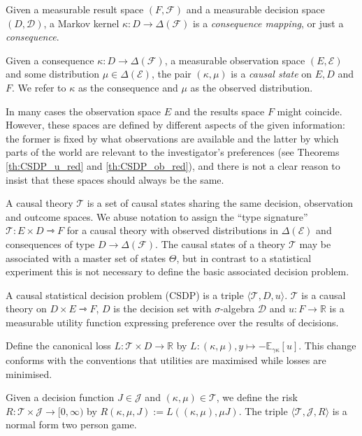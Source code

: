 \begin{definition}[Consequences]
Given a measurable result space $(F,\mathcal{F})$ and a measurable decision space $(D,\mathcal{D})$, a Markov kernel $\kappa:D \to \Delta(\mathcal{F})$ is a \emph{consequence mapping}, or just a \emph{consequence}.
\end{definition}

\begin{definition}
Given a consequence $\kappa:D\to \Delta(\mathcal{F})$, a measurable observation space $(E,\mathcal{E})$ and some distribution $\mu\in \Delta(\mathcal{E})$, the pair $(\kappa,\mu)$ is a \emph{causal state} on $E, D$ and $F$. We refer to $\kappa$ as the consequence and $\mu$ as the observed distribution.
\end{definition}

In many cases the observation space $E$ and the results space $F$ might coincide. However, these spaces are defined by different aspects of the given information: the former is fixed by what observations are available and the latter by which parts of the world are relevant to the investigator's preferences (see Theorems \ref{th:CSDP_u_red} and \ref{th:CSDP_ob_red}), and there is not a clear reason to insist that these spaces should always be the same.

\begin{definition}\label{def:causal_theory}
A causal theory $\mathscr{T}$ is a set of causal states sharing the same decision, observation and outcome spaces. We abuse notation to assign the ``type signature'' $\mathscr{T}:E\times D\rightarrowtriangle F$ for a causal theory with observed distributions in $\Delta(\mathcal{E})$ and consequences of type $D\to \Delta(\mathcal{F})$. The causal states of a theory $\mathscr{T}$ may be associated with a master set of states $\Theta$, but in contrast to a statistical experiment this is not necessary to define the basic associated decision problem.
\end{definition}

\begin{definition}\label{def:CSDP}
A causal statistical decision problem (CSDP) is a triple $\langle \mathscr{T}, D, u \rangle$. $\mathscr{T}$ is a causal theory on $D\times E\rightarrowtriangle F$, $D$ is the decision set with $\sigma$-algebra $\mathcal{D}$ and $u:F\to \mathbb{R}$ is a measurable utility function expressing preference over the results of decisions.

Define the canonical loss $L:\mathscr{T}\times D\to \mathbb{R}$ by $L:(\kappa,\mu),y\mapsto -\mathbb{E}_{\gamma\kappa}[u]$. This change conforms with the conventions that utilities are maximised while losses are minimised.

Given a decision function $J\in\mathscr{J}$ and $(\kappa,\mu)\in \mathscr{T}$, we define the risk $R:\mathscr{T}\times \mathscr{J} \to [0,\infty)$ by $R(\kappa,\mu,J) := L((\kappa,\mu),\mu J)$. The triple $\langle \mathscr{T}, \mathscr{J}, R\rangle$ is a normal form two person game.
\end{definition}

